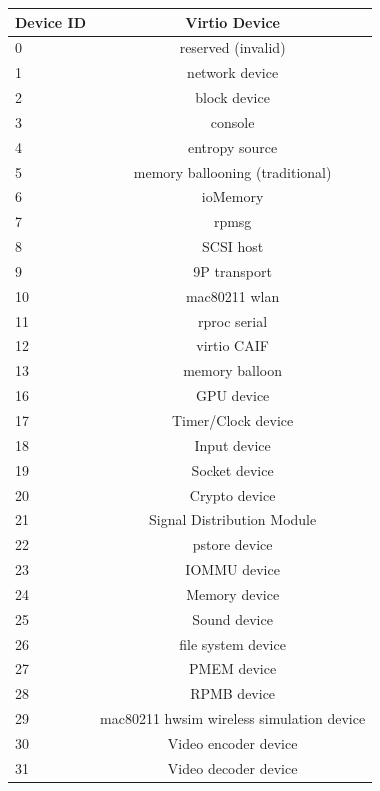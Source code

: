 \begin{tabular} { |l|c| }
\hline
Device ID  &  Virtio Device    \\
\hline \hline
0          & reserved (invalid) \\
\hline
1          &   network device     \\
\hline
2          &   block device     \\
\hline
3          &      console       \\
\hline
4          &  entropy source    \\
\hline
5          & memory ballooning (traditional)  \\
\hline
6          &     ioMemory       \\
\hline
7          &       rpmsg        \\
\hline
8          &     SCSI host      \\
\hline
9          &   9P transport     \\
\hline
10         &   mac80211 wlan    \\
\hline
11         &   rproc serial     \\
\hline
12         &   virtio CAIF      \\
\hline
13         &  memory balloon    \\
\hline
16         &   GPU device       \\
\hline
17         &   Timer/Clock device \\
\hline
18         &   Input device \\
\hline
19         &   Socket device \\
\hline
20         &   Crypto device \\
\hline
21         &   Signal Distribution Module \\
\hline
22         &   pstore device \\
\hline
23         &   IOMMU device \\
\hline
24         &   Memory device \\
\hline
25         &   Sound device \\
\hline
26         &   file system device \\
\hline
27         &   PMEM device \\
\hline
28         &   RPMB device \\
\hline
29         &   mac80211 hwsim wireless simulation device \\
\hline
30         &   Video encoder device \\
\hline
31         &   Video decoder device \\

\end{tabular}
